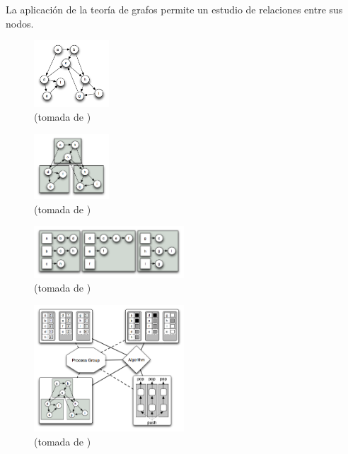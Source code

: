 La aplicación de la teoría de grafos permite un estudio de relaciones entre sus nodos. 



\begin{figure}[H]
	\centering
	\includegraphics[width=0.25\textwidth]{aux/grafo}
	\caption[Estructura de un Grafo]{
	(tomada de \cite{BoostGrafos})}
\end{figure}


\begin{figure}[H]
	\centering
	\includegraphics[width=0.25\textwidth]{aux/distributed-graph}
	\caption[Grafo Distribuido]{
	(tomada de \cite{BoostGrafos})}
\end{figure}


\begin{figure}[H]
	\centering
	\includegraphics[width=0.5\textwidth]{aux/dist-adjlist}
	\caption[Grafo en lista de adyacencia]{
	(tomada de \cite{BoostGrafos})}
\end{figure}


\begin{figure}[H]
	\centering
	\includegraphics[width=0.5\textwidth]{aux/arquitectura_grafos}
	\caption[Aquitectura de Grafos]{
	(tomada de \cite{BoostGrafos})}
\end{figure}


